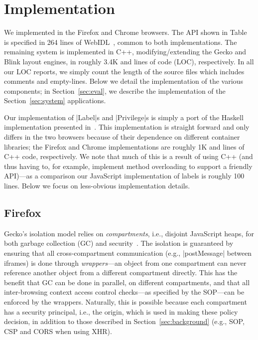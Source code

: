 \section{Implementation}
\label{sec:implementation}

We implemented \sys{} in the Firefox and Chrome browsers.
%
The API shown in Table~ is specified in 264
lines of WebIDL~\cite{webidl}, common to both
implementations.
%
The remaining system is implemented in C++, modifying/extending the Gecko and
Blink layout engines, in roughly 3.4K and  lines of code (LOC),
respectively.
%
In all our LOC reports, we simply count the length of the source files which
includes comments and empty-lines.
%
Below we detail the implementation of the various \sys{} components;
in Section~\ref{sec:eval}, we describe the implementation of the
Section~\ref{sec:system} applications.

%
Our implementation of \js|Label|s and \js|Privilege|s is simply a port
of the Haskell implementation presented
in~\cite{stefan:2011:dclabels,stefan:2011:flexible}. 
%
This implementation is straight forward and only differs in the two
browsers because of their dependence on different container libraries;
the Firefox and Chrome implementations are roughly 1K and 
lines of C++ code, respectively.
%
We note that much of this is a result of using C++ (and thus having
to, for example, implement method overloading to support a friendly
API)---as a comparison our JavaScript implementation of labels is
roughly 100 lines.
%
Below we focus on less-obvious implementation details.
%

\subsection{Firefox}
\label{sec:implementation:firefox}

Gecko's isolation model relies on \emph{compartments}, i.e., disjoint
JavaScript heaps, for both garbage collection (GC) and
security~\cite{wagner2011compartmental}.
%
The isolation is guaranteed by ensuring that all cross-compartment
communication (e.g., \js|postMessage| between iframes) is done through
\emph{wrappers}---an object from one compartment can never reference
another object from a different compartment directly.
%
This has the benefit that GC can be done in parallel, on different
compartments, and that all inter-browsing context access control
checks---as specified by the SOP---can be enforced by the wrappers.
%
Naturally, this is possible because each compartment has a security
principal, i.e., the origin, which is used in making these policy
decision, in addition to those described in
Section~\ref{sec:background} (e.g., SOP, CSP and CORS when using XHR).


